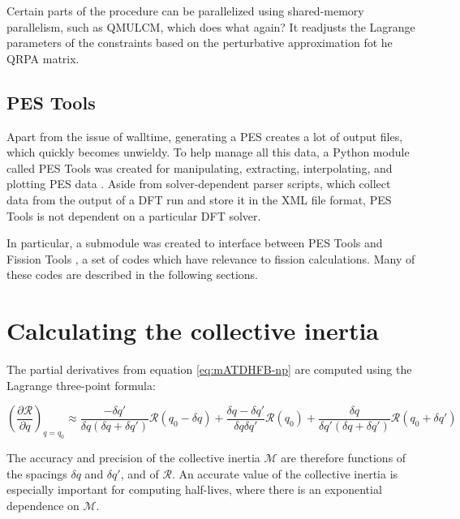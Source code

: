 Certain parts of the procedure can be parallelized using shared-memory parallelism, such as QMULCM, which does what again? It readjusts the Lagrange parameters of the constraints based on the perturbative approximation fot he QRPA matrix.

\subsection{PES Tools}
Apart from the issue of walltime, generating a PES creates a lot of output files, which quickly becomes unwieldy. To help manage all this data, a Python module called PES Tools was created for manipulating, extracting, interpolating, and plotting PES data \cite{PES_tools}. Aside from solver-dependent parser scripts, which collect data from the output of a DFT run and store it in the XML file format, PES Tools is not dependent on a particular DFT solver.

In particular, a submodule was created to interface between PES Tools and Fission Tools \cite{fission_tools}, a set of codes which have relevance to fission calculations. Many of these codes are described in the following sections.

\section{Calculating the collective inertia}\label{sect:M_numerical}
The partial derivatives from equation \ref{eq:mATDHFB-np} are computed using the Lagrange three-point formula:

\begin{equation}\label{eq:finite-diffs}
\left(\frac{\partial \mathcal{R}}{\partial q}\right)_{q=q_0} \approx 
    \frac{-\delta q'}{\delta q \left(\delta q + \delta q'\right)}\mathcal{R}(q_0-\delta q) + 
    \frac{\delta q - \delta q'}{\delta q \delta q'}\mathcal{R}(q_0) + 
    \frac{\delta q}{\delta q' \left(\delta q + \delta q'\right)}\mathcal{R}(q_0+\delta q')
\end{equation}

The accuracy and precision of the collective inertia $\mathcal{M}$ are therefore functions of the spacings $\delta q$ and $\delta q'$, and of $\mathcal{R}$. An accurate value of the collective inertia is especially important for computing half-lives, where there is an exponential dependence on $\mathcal{M}$.

